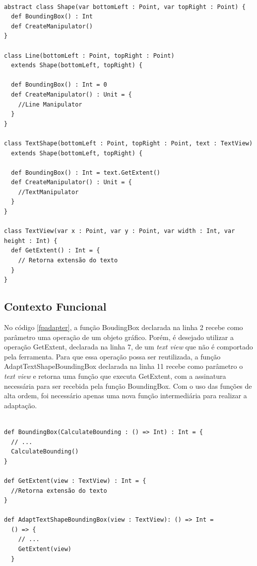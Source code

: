 \begin{lstlisting}[caption={Adapter Orientado a Objetos},label=ooadapter]

abstract class Shape(var bottomLeft : Point, var topRight : Point) {
  def BoundingBox() : Int
  def CreateManipulator()
}

class Line(bottomLeft : Point, topRight : Point)
  extends Shape(bottomLeft, topRight) {

  def BoundingBox() : Int = 0
  def CreateManipulator() : Unit = {
    //Line Manipulator
  }
}

class TextShape(bottomLeft : Point, topRight : Point, text : TextView)
  extends Shape(bottomLeft, topRight) {

  def BoundingBox() : Int = text.GetExtent()
  def CreateManipulator() : Unit = {
    //TextManipulator
  }
}

class TextView(var x : Point, var y : Point, var width : Int, var height : Int) {
  def GetExtent() : Int = {
    // Retorna extensão do texto
  }
}

\end{lstlisting}

\subsection*{Contexto Funcional}

No código \ref{fpadapter}, a função BoudingBox declarada 
na linha 2 recebe como parâmetro uma operação de um 
objeto gráfico. Porém, é desejado utilizar a operação 
GetExtent, declarada na linha 7, de um \textit{text view} 
que não é comportado pela ferramenta. Para que essa 
operação possa ser reutilizada, a função 
AdaptTextShapeBoundingBox declarada na linha 11 
recebe como parâmetro o \textit{text view} e retorna 
uma função que executa GetExtent, com a assinatura 
necessária para ser recebida pela função BoundingBox. 
Com o uso das funções de alta ordem, foi necessário 
apenas uma nova função intermediária para realizar a 
adaptação.

\begin{lstlisting}[caption={Adapter Funcional},label=fpadapter]
    
def BoundingBox(CalculateBounding : () => Int) : Int = {
  // ...
  CalculateBounding()
}

def GetExtent(view : TextView) : Int = {
  //Retorna extensão do texto
}

def AdaptTextShapeBoundingBox(view : TextView): () => Int =
  () => {
    // ...
    GetExtent(view)
  }
    
\end{lstlisting}